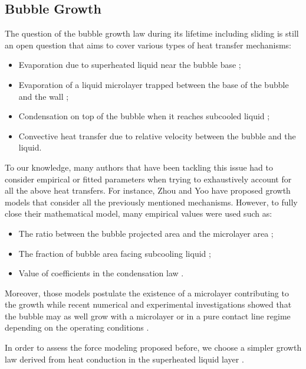 \subsection{Bubble Growth}


The question of the bubble growth law during its lifetime including sliding is still an open question that aims to cover various types of heat transfer mechanisms:

\begin{itemize}
\item Evaporation due to superheated liquid near the bubble base ;
\item Evaporation of a liquid microlayer trapped between the base of the bubble and the wall ;
\item Condensation on top of the bubble when it reaches subcooled liquid ;
\item Convective heat transfer due to relative velocity between the bubble and the liquid.
\end{itemize}

To our knowledge, many authors that have been tackling this issue had to consider empirical or fitted parameters when trying to exhaustively account for all the above heat transfers. For instance, Zhou \cite{zhou_experimental_2020} and Yoo \cite{yoo_development_2018} have proposed growth models that consider all the previously mentioned mechanisms. However, to fully close their mathematical model, many empirical values were used such as:

\begin{itemize}
\item The ratio between the bubble projected area and the microlayer area ;
\item The fraction of bubble area facing subcooling liquid ;
\item Value of coefficients in the condensation law \cite{levenspiel_collapse_1959}.
\end{itemize}

Moreover, those models postulate the existence of a microlayer contributing to the growth while recent numerical and experimental investigations showed that the bubble may as well grow with a microlayer or in a pure contact line regime depending on the operating conditions \cite{urbano_direct_2018, bures_modelling_2021, kossolapov_experimental_2021}.

In order to assess the force modeling proposed before, we choose a simpler growth law derived from heat conduction in the superheated liquid layer \cite{plesset_growth_1954}. 

